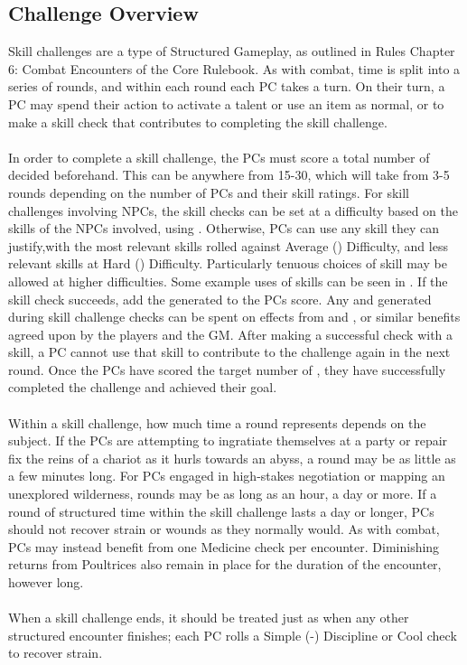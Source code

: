 \begin{multicols}{2}

\subsection{Challenge Overview}
Skill challenges are a type of Structured Gameplay, as outlined in Rules Chapter 6: Combat Encounters
of the Core Rulebook. As with combat, time is split into a series of rounds, and within each round
each PC takes a turn. On their turn, a PC may spend their action to activate a talent or use an item
as normal, or to make a skill check that contributes to completing the skill challenge.\\
\\
In order to complete a skill challenge, the PCs must score a total number of \success decided beforehand.
This can be anywhere from 15-30, which will take from 3-5 rounds depending on the number of PCs and their
skill ratings. For skill challenges involving NPCs, the skill checks can be set at a difficulty based on
the skills of the NPCs involved, using . Otherwise,
PCs can use any skill they can justify,with the most relevant skills rolled against Average (\difficulty\difficulty)
Difficulty, and less relevant skills at Hard (\difficulty\difficulty\difficulty) Difficulty. Particularly
tenuous choices of skill may be allowed at higher difficulties. Some example uses of skills can be seen in
. If the skill check succeeds, add the \success generated to the PCs score.
Any \advantage \triumph \threat and \despair generated during skill challenge checks can be spent on effects
from  and , or similar benefits agreed
upon by the players and the GM. After making a successful check with a skill, a PC cannot use that skill to
contribute to the challenge again in the next round. Once the PCs have scored the target number of \success,
they have successfully completed the challenge and achieved their goal.\\
\\
Within a skill challenge, how much time a round represents depends on the subject. If the PCs are attempting
to ingratiate themselves at a party or repair fix the reins of a chariot as it hurls towards an abyss, a
round may be as little as a few minutes long. For PCs engaged in high-stakes negotiation or mapping an unexplored
wilderness, rounds may be as long as an hour, a day or more. If a round of structured time within the skill
challenge lasts a day or longer, PCs should not recover strain or wounds as they normally would. As with
combat, PCs may instead benefit from one Medicine check per encounter. Diminishing returns from Poultrices also
remain in place for the duration of the encounter, however long.\\
\\
When a skill challenge ends, it should be treated just as when any other structured encounter finishes; each
PC rolls a Simple (-) Discipline or Cool check to recover strain.


\end{multicols}
